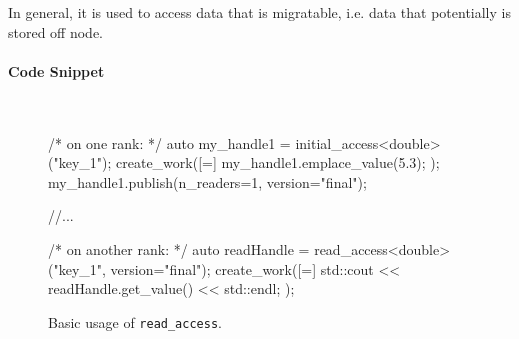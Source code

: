 In general, it is used to access data that is migratable, i.e. data 
that potentially is stored off node.


\paragraph{Code Snippet}\mbox{}\\
\begin{figure}[!h]
\begin{CppCodeNumb}
/* on one rank: */
auto my_handle1 = initial_access<double>("key_1");
create_work([=]{
  my_handle1.emplace_value(5.3);
});
my_handle1.publish(n_readers=1, version="final");

//...

/* on another rank: */
auto readHandle = read_access<double>("key_1", version="final");
create_work([=]{
  std::cout << readHandle.get_value() << std::endl;
});
\end{CppCodeNumb}
\label{fig:fe_api_readaccess}
\caption{Basic usage of \texttt{read\_access}.}
\end{figure}



